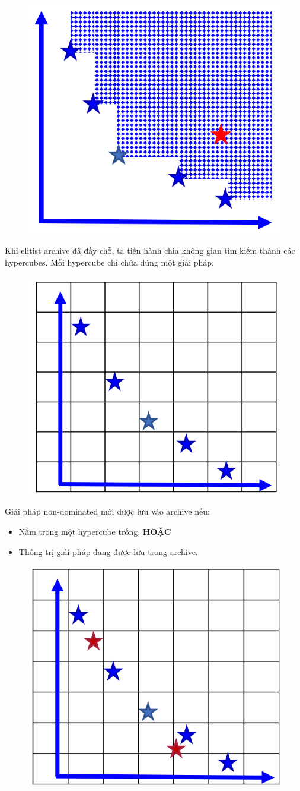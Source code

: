 \documentclass{book}
\begin{document}
\begin{figure}[H]
    \centering
    \includegraphics[width=0.5\linewidth]{images/GA-7-8_62.png}
\end{figure}

Khi elitist archive đã đầy chỗ, ta tiến hành chia không gian tìm kiếm thành các hypercubes. Mỗi hypercube chỉ chứa đúng một giải pháp.

\begin{figure}[H]
    \centering
    \includegraphics[width=0.5\linewidth]{images/GA-7-8_63.png}
\end{figure}

Giải pháp non-dominated mới được lưu vào archive nếu:
\begin{itemize}
    \item Nằm trong một hypercube trống, \textbf{HOẶC}
    \item Thống trị giải pháp đang được lưu trong archive.
\end{itemize}

\begin{figure}[H]
    \centering
    \includegraphics[width=0.5\linewidth]{images/GA-7-8_64.png}
\end{figure}
\end{document}
